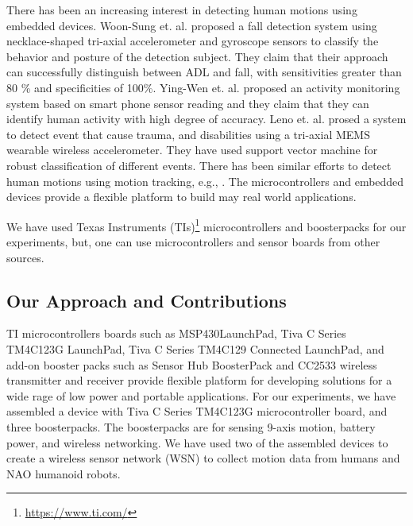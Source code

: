 \documentclass[letterpaper]{article}
\begin{document}
\begin{sloppy}
There has been an increasing interest in detecting human motions using embedded devices. Woon-Sung
et. al. \cite{baek2013real} proposed  a fall  detection  system  using necklace-shaped tri-axial
accelerometer  and  gyroscope  sensors  to  classify  the  behavior  and  posture  of  the detection
 subject. They claim that their  approach  can  successfully  distinguish between  ADL and  fall, 
with  sensitivities  greater  than  80 \%  and specificities  of  100\%. Ying-Wen et. al.
\cite{bai2013recognition} proposed an activity monitoring system based on smart phone sensor
reading and they claim that they can identify human activity with high degree of accuracy. Leno et.
al. \cite{leone2013supervised} prosed a system to detect event that cause trauma, and disabilities
using a tri-axial MEMS wearable wireless accelerometer. They have used support vector machine for
robust classification of different events. There has been similar efforts to detect human motions
using motion tracking, e.g., \cite{dumitrache2013fall,kumarwearable,liang2012pre}. The 
microcontrollers and embedded devices provide a flexible platform to build may 
real world applications. 

We have used Texas Instruments (TIs)\footnote{\url{https://www.ti.com/}} 
 microcontrollers and boosterpacks for our 
experiments, but, one can use microcontrollers and sensor boards from other sources.  



\subsection{Our Approach and Contributions}

TI microcontrollers  boards such 
as MSP430{\texttrademark}LaunchPad, Tiva{\texttrademark} C Series TM4C123G
LaunchPad, Tiva C Series 
TM4C129 Connected LaunchPad, and add-on booster packs such as Sensor Hub BoosterPack and CC2533 
wireless transmitter and 
receiver  provide flexible platform for developing solutions for a wide rage of low power 
and portable applications. For our experiments, we have assembled a device with Tiva C Series 
TM4C123G microcontroller board, and three boosterpacks. The boosterpacks are for sensing 9-axis 
motion, battery power, and wireless networking. We have used two of the assembled devices to create 
a wireless sensor network (WSN) to collect motion data from  humans and NAO humanoid robots.   


\end{sloppy}
\end{document}
